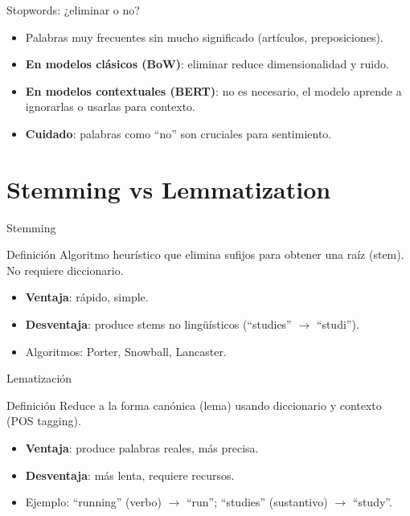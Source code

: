 \documentclass[aspectratio=169, 10pt, xcolor=table]{beamer}
\begin{document}
\begin{frame}{Stopwords: ¿eliminar o no?}
    \begin{itemize}
        \item Palabras muy frecuentes sin mucho significado (artículos, preposiciones).
        \item \textbf{En modelos clásicos (BoW)}: eliminar reduce dimensionalidad y ruido.
        \item \textbf{En modelos contextuales (BERT)}: no es necesario, el modelo aprende a ignorarlas o usarlas para contexto.
        \item \textbf{Cuidado}: palabras como ``no'' son cruciales para sentimiento.
    \end{itemize}
\end{frame}

\section{Stemming vs Lemmatization}

\begin{frame}{Stemming}
    \begin{block}{Definición}
        Algoritmo heurístico que elimina sufijos para obtener una raíz (stem). No requiere diccionario.
    \end{block}
    \begin{itemize}
        \item \textbf{Ventaja}: rápido, simple.
        \item \textbf{Desventaja}: produce stems no lingüísticos (``studies'' $\rightarrow$ ``studi'').
        \item Algoritmos: Porter, Snowball, Lancaster.
    \end{itemize}
\end{frame}

\begin{frame}{Lematización}
    \begin{block}{Definición}
        Reduce a la forma canónica (lema) usando diccionario y contexto (POS tagging).
    \end{block}
    \begin{itemize}
        \item \textbf{Ventaja}: produce palabras reales, más precisa.
        \item \textbf{Desventaja}: más lenta, requiere recursos.
        \item Ejemplo: ``running'' (verbo) $\rightarrow$ ``run''; ``studies'' (sustantivo) $\rightarrow$ ``study''.
    \end{itemize}
\end{frame}
\end{document}
